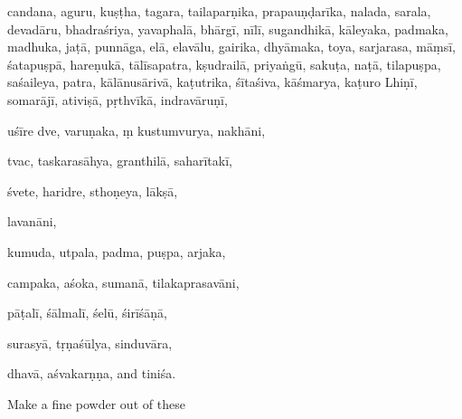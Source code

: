 \begin{translation}
\gls{candana}, \gls{aguru},  \gls{kuṣṭha},  \gls{tagara},  
\gls{tailaparṇika}, 
\gls{prapauṇḍarīka},  
\gls{nalada},  
\gls{sarala},  
\gls{devadāru}, 
\gls{bhadraśriya},  
\gls{yavaphalā},  
\gls{bhārgī}, 
\gls{nīlī},  
\gls{sugandhikā}, 
\gls{kāleyaka},  
\gls{padmaka},  
\gls{madhuka},  
 \gls{jaṭā}, 
\gls{punnāga},
\gls{elā},  
\gls{elavālu},  \gls{gairika},  \gls{dhyāmaka},  
\gls{toya},  
\gls{sarjarasa}, 
\gls{māṃsī},  
\gls{śatapuṣpā},  
\gls{hareṇukā}, 
\gls{tālīsapatra},   
\gls{kṣudrailā},   
\gls{priyaṅgū},   
\gls{sakuṭa},   
\gls{naṭā},  
\gls{tilapuṣpa},   
\gls{saśaileya},   
\gls{patra},  
\gls{kālānusārivā},  
\gls{kaṭutrika},   
\gls{śītaśiva},   
\gls{kāśmarya},   
\gls{kaṭuro Lhiṇī},  
\gls{somarājī},   
\gls{ativiṣā},  
\gls{pṛthvīkā},  
\gls{indravāruṇī}, 

\gls{uśīre dve},  
\gls{varuṇaka}, ṃ 
\gls{kustumvurya},  
\gls{nakhāni},  


\gls{tvac},  
\gls{taskarasāhya},  
\gls{granthilā},  
\gls{saharītakī}, 


\gls{śvete},  
\gls{haridre}, 
\gls{ sthoṇeya},  
\gls{lākṣā},   

\gls{lavanāni}, 


\gls{kumuda},  
\gls{utpala},  
\gls{padma},  
\gls{puṣpa},  
\gls{arjaka}, 


\gls{campaka},  
\gls{aśoka},  
\gls{sumanā},  
\gls{tilakaprasavāni}, 


\gls{pāṭalī},  
\gls{śālmalī},  
\gls{śelū},  
\gls{śirīśāṇā},  


\gls{surasyā},  
\gls{tṛṇaśūlya},  
\gls{sinduvāra}, 


\gls{dhavā},  
\gls{aśvakarṇṇa},  and 
\gls{tiniśa}.

Make a fine powder out of these


\end{translation}

